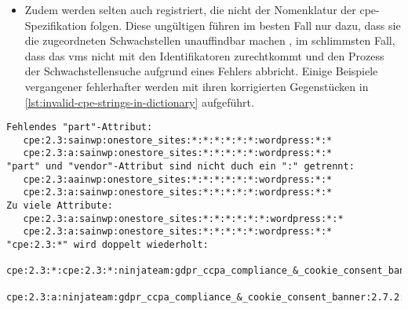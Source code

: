 \begin{itemize}
    \item Zudem werden selten auch  registriert, die nicht der Nomenklatur der \acrshort{cpe}-Spezifikation folgen.
    Diese ungültigen  führen im besten Fall nur dazu, dass sie die zugeordneten Schwachstellen unauffindbar machen \autocite{Takahashi_Miyamoto_Nakao_2016}, im schlimmsten Fall, dass das \acrshort{vms} nicht mit den Identifikatoren zurechtkommt und den Prozess der Schwachstellensuche aufgrund eines Fehlers abbricht.
    Einige Beispiele vergangener fehlerhafter  werden mit ihren korrigierten Gegenstücken in \autoref{lst:invalid-cpe-strings-in-dictionary} aufgeführt.
\end{itemize}

\begin{lstlisting}[caption=Ungültige CPE 2.3 Format Strings aus dem NVD CPE Dictionary und ihre korrigierten Gegenstücke,label=lst:invalid-cpe-strings-in-dictionary]
Fehlendes "part"-Attribut:
   cpe:2.3:sainwp:onestore_sites:*:*:*:*:*:*:wordpress:*:*
   cpe:2.3:a:sainwp:onestore_sites:*:*:*:*:*:wordpress:*:*
"part" und "vendor"-Attribut sind nicht duch ein ":" getrennt:
   cpe:2.3:aainwp:onestore_sites:*:*:*:*:*:*:wordpress:*:*
   cpe:2.3:a:sainwp:onestore_sites:*:*:*:*:*:wordpress:*:*
Zu viele Attribute:
   cpe:2.3:a:sainwp:onestore_sites:*:*:*:*:*:*:wordpress:*:*
   cpe:2.3:a:sainwp:onestore_sites:*:*:*:*:*:wordpress:*:*
"cpe:2.3:*" wird doppelt wiederholt:
   cpe:2.3:*:cpe:2.3:*:ninjateam:gdpr_ccpa_compliance_&_cookie_consent_banner:2.7.2:*:*:*:*:wordpress:*:*
   cpe:2.3:a:ninjateam:gdpr_ccpa_compliance_&_cookie_consent_banner:2.7.2:*:*:*:*:wordpress:*:*
\end{lstlisting}


